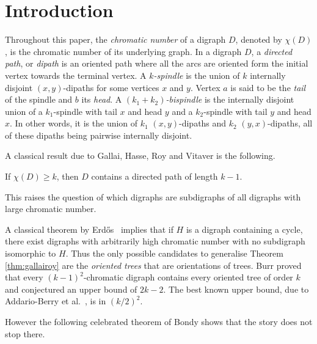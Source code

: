 \documentclass{endm}
\begin{document}
\section{Introduction}
Throughout this paper, the {\it chromatic number} of a digraph $D$, denoted by $\chi(D)$, is the chromatic number of its underlying graph. 
In a digraph $D$, a \emph{directed path}, or \emph{dipath} is an oriented path where all the arcs are oriented form the initial vertex towards the terminal vertex.
A {\it $k$-spindle} is the union of $k$ internally disjoint $(x,y)$-dipaths for some vertices $x$ and $y$. Vertex $a$ is said to be the {\it tail} of the spindle and $b$ its {\it head}.
A {\it $(k_1+k_2)$-bispindle} is the internally disjoint union of a $k_1$-spindle
with tail $x$ and head $y$ and a  $k_2$-spindle with tail $y$ and head $x$.
In other words, it is the union of $k_1$  $(x,y)$-dipaths and $k_2$ $(y,x)$-dipaths, all of these dipaths being pairwise internally disjoint.

A classical result due to Gallai, Hasse, Roy and Vitaver is the following. 
\begin{theorem}\label{thm:gallairoy}
	If $\chi(D) \geq k$, then $D$ contains a directed path of length $k-1$.  
\end{theorem}   

This raises the question of which digraphs are subdigraphs of all digraphs with large chromatic number.



A classical theorem by Erd\H{o}s~\cite{Erd59} implies that if $H$ is a digraph containing a cycle, there exist digraphs with arbitrarily high 
chromatic number with no subdigraph isomorphic to $H$. Thus the only possible candidates to generalise Theorem \ref{thm:gallairoy} are the {\it oriented trees} that are orientations of trees.
Burr\cite{Burr80} proved that every $(k-1)^2$-chromatic digraph contains every oriented tree of order $k$ 
and conjectured an upper bound of $2k-2$.
The best known upper bound, due to Addario-Berry et al.~\cite{AHS+13}, is in $(k/2)^2$.

However the following celebrated theorem of Bondy shows that  the story does not stop there.
\end{document}
